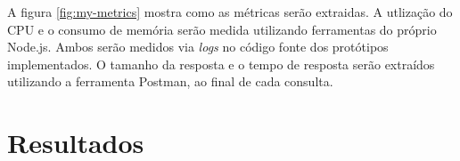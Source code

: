 A figura \ref{fig:my-metrics} mostra como as métricas serão extraidas. A utlização do CPU e o consumo de memória serão medida utilizando ferramentas do próprio Node.js. Ambos serão medidos via \textit{logs} no código fonte dos protótipos implementados. O tamanho da resposta e o tempo de resposta serão extraídos utilizando a ferramenta Postman, ao final de cada consulta.

\section{Resultados} \label{sec:resultados}
